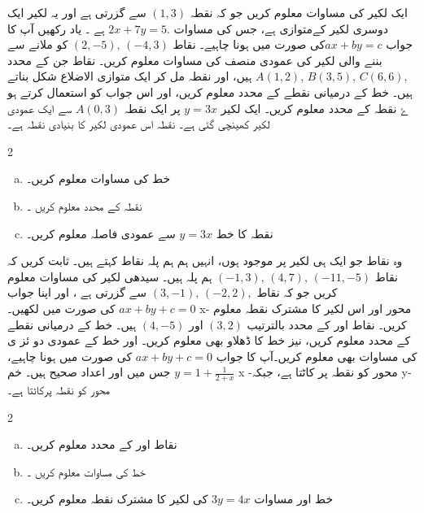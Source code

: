 ایک لکیر کی مساوات معلوم کریں جو کہ نقطہ \( (1,3) \) سے گزرتی ہے اور یہ لکیر  ایک دوسری لکیر کےمتوازی ہے، جس کی مساوات \(2x+7y=5. \) ہے ۔ یاد رکھیں آپ کا جواب  \(ax+by=c \)کی صورت میں ہونا چاہیے۔
 نقاط \( (2,-5), \, (-4,3) \) کو ملانے سے بننے والی لکیر کی عمودی  منصف کی مساوات معلوم کریں۔
نقاط جن کے محدد \( A(1,2), \, B(3,5), \, C(6,6), \) ہیں، اور نقطہ  مل کر ایک متوازی الاضلاع شکل بناتے ہیں۔ خط  کے درمیانی نقطے کے محدد معلوم کریں، اور اس جواب کو استعمال کرتے ہو ۓ نقطہ  کے محدد معلوم کریں۔  
ایک لکیر   \(y=3x\) پر ایک نقطہ \(A(0,3) \) سے ایک عمودی لکیر کھینچی گئی ہے۔ نقطہ   اس عمودی لکیر  کا بنیادی نقطہ  ہے۔
\begin{multicols}{2}
 \begin{enumerate}[a.]
\item
خط کی مساوات معلوم کریں۔ 
\item
نقطہ کے محدد معلوم کریں ۔
\item
نقطہ  کا خط  \(y=3x\) سے عمودی فاصلہ معلوم کریں۔
\end{enumerate}
\end{multicols}
وہ نقاط جو ایک ہی لکیر پر موجود ہوں، انہیں ہم ہم پلہ نقاط کہتے ہیں۔ ثابت کریں کہ نقاط \( (-1,3), \, (4,7), \, (-11,-5) \) ہم پلہ ہیں۔
سیدھی لکیر کی مساوات معلوم کریں  جو کہ نقاط \( (3,-1), \, (-2,2), \) سے گزرتی ہے ، اور اپنا جواب \(ax+by+c=0 \) کی صورت میں لکھیں۔ x- محور اور اس لکیر کا مشترک نقطہ معلوم کریں۔
نقاط  اور کے محدد بالترتیب \( (3,2)\)  اور  \((4,-5) \) ہیں۔ خط  کے درمیانی نقطے کے محدد معلوم کریں، نیز خط  کا ڈھلاو بھی معلوم کریں۔
اور خط  کے عمودی  دو ئز ی کی مساوات بھی معلوم کریں۔آپ کا جواب \(ax+by+c=0 \) کی صورت میں ہونا چاہیے، جس میں   اور  اعداد صحیح ہیں۔  
خم \( y= 1 + \frac{1}{2+x} \) x -محور کو نقطہ  پر کاٹتا ہے، جبکہ y- محور کو نقطہ پرکاٹتا ہے۔
\begin{multicols}{2}
 \begin{enumerate}[a.]
\item  
نقاط  اور  کے محدد معلوم کریں۔
\item
خط  کی مساوات معلوم کریں ۔
\item
خط  اور مساوات \( 3y=4x \) کی لکیر کا مشترک نقطہ معلوم کریں۔
\end{enumerate}
\end{multicols}
